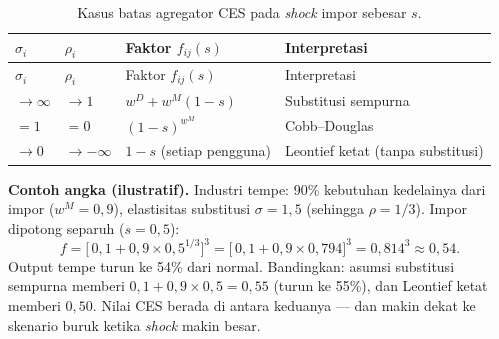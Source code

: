 \documentclass[
  manuscript=article,
  layout=publish,
  year=2026,
  volume=1,
]{den}
\begin{document}
\begin{longtable}[]{@{}
  >{\centering\arraybackslash}p{}
  >{\centering\arraybackslash}p{}
  >{\raggedright\arraybackslash}p{}
  >{\raggedright\arraybackslash}p{}@{}}
\caption{Kasus batas agregator CES pada \emph{shock} impor sebesar
\(s\).}\label{tbl-ceslimits}\tabularnewline
\toprule\noalign{}
\begin{minipage}[b]{\linewidth}\centering
\(\sigma_i\)
\end{minipage} & \begin{minipage}[b]{\linewidth}\centering
\(\rho_i\)
\end{minipage} & \begin{minipage}[b]{\linewidth}\raggedright
Faktor \(f_{ij}(s)\)
\end{minipage} & \begin{minipage}[b]{\linewidth}\raggedright
Interpretasi
\end{minipage} \\
\midrule\noalign{}
\endfirsthead
\toprule\noalign{}
\begin{minipage}[b]{\linewidth}\centering
\(\sigma_i\)
\end{minipage} & \begin{minipage}[b]{\linewidth}\centering
\(\rho_i\)
\end{minipage} & \begin{minipage}[b]{\linewidth}\raggedright
Faktor \(f_{ij}(s)\)
\end{minipage} & \begin{minipage}[b]{\linewidth}\raggedright
Interpretasi
\end{minipage} \\
\midrule\noalign{}
\endhead
\bottomrule\noalign{}
\endlastfoot
\(\to \infty\) & \(\to 1\) & \(w^D + w^M(1-s)\) & Substitusi sempurna \\
\(= 1\) & \(= 0\) & \((1-s)^{w^M}\) & Cobb--Douglas \\
\(\to 0\) & \(\to -\infty\) & \(1-s\) (setiap pengguna) & Leontief ketat
(tanpa substitusi) \\
\end{longtable}

\begin{intuisi}

\textbf{Contoh angka (ilustratif).} Industri tempe: 90\% kebutuhan
kedelainya dari impor (\(w^M = 0{,}9\)), elastisitas substitusi
\(\sigma = 1{,}5\) (sehingga \(\rho =
1/3\)). Impor dipotong separuh (\(s = 0{,}5\)): \[
f = \bigl[\,0{,}1 + 0{,}9 \times 0{,}5^{1/3}\bigr]^{3}
  = \bigl[\,0{,}1 + 0{,}9 \times 0{,}794\bigr]^{3}
  = 0{,}814^{3} \approx 0{,}54 .
\] Output tempe turun ke 54\% dari normal. Bandingkan: asumsi substitusi
sempurna memberi \(0{,}1 + 0{,}9 \times 0{,}5 = 0{,}55\) (turun ke
55\%), dan Leontief ketat memberi \(0{,}50\). Nilai CES berada di antara
keduanya --- dan makin dekat ke skenario buruk ketika \emph{shock} makin
besar.

\end{intuisi}
\end{document}
